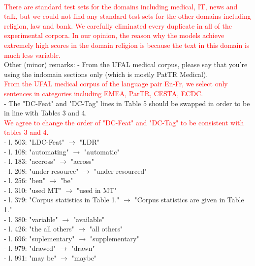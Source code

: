 \documentclass[12pt,times,a4paper,twoside]{article}
\theoremstyle{definition}
\begin{document}
\\
\textcolor{red}{There are standard test sets for the domains including medical, IT, news and talk, but we could not find any standard test sets for the other domains including religion, law and bank. We carefully eliminated every duplicate in all of the experimental corpora. In our opinion, the reason why the models achieve extremely high scores in the domain religion is because the text in this domain is much less variable.}
\\
Other (minor) remarks:
- From the UFAL medical corpus, please say that you're using the indomain sections only (which is mostly PatTR Medical).
\\
\textcolor{red}{From the UFAL medical corpus of the language pair En-Fr, we select only sentences in categories including EMEA, ParTR, CESTA, ECDC.}
\\
- The "DC-Feat" and "DC-Tag" lines in Table 5 should be swapped in order to be in line with Tables 3 and 4.
\\
\textcolor{red}{We agree to change the order of "DC-Feat" and "DC-Tag" to be consistent with tables 3 and 4.}
\\
- l. 503: "LDC-Feat" $\rightarrow$ "LDR"
\\
- l. 108: "automating" $\rightarrow$ "automatic"
\\
- l. 183: "accross" $\rightarrow$ "across"
\\
- l. 208: "under-resource" $\rightarrow$ "under-resourced"
\\
- l. 256: "ben" $\rightarrow$ "be"
\\
- l. 310: "used MT" $\rightarrow$ "used in MT"
\\
- l. 379: "Corpus statistics in Table 1." $\rightarrow$ "Corpus statistics are given in
Table 1."
\\
- l. 380: "variable" $\rightarrow$ "available"
\\
- l. 426: "the all others" $\rightarrow$ "all others"
\\
- l. 696: "suplementary" $\rightarrow$ "supplementary"
\\
- l. 979: "drawed" $\rightarrow$ "drawn"
\\
- l. 991: "may be" $\rightarrow$ "maybe"



\end{document}
